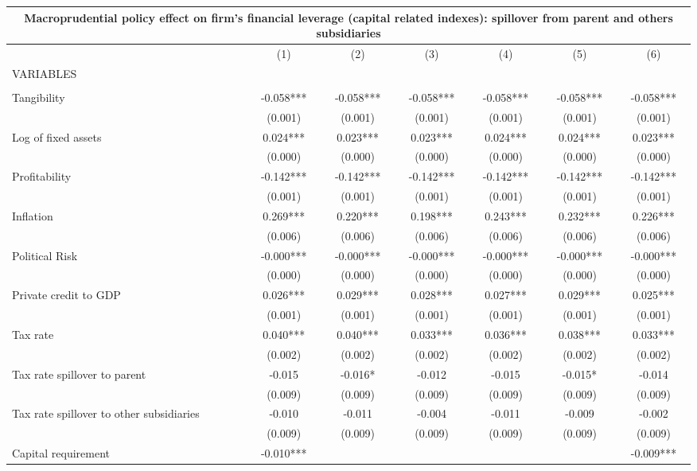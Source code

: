 \begin{tabular}{lcccccc}
\multicolumn{7}{c}{Macroprudential policy effect on firm's financial leverage (capital related indexes): spillover from parent and others subsidiaries} \\ \hline
 & (1) & (2) & (3) & (4) & (5) & (6) \\
VARIABLES &  &  &  &  &  &  \\ \hline
 &  &  &  &  &  &  \\
Tangibility & -0.058*** & -0.058*** & -0.058*** & -0.058*** & -0.058*** & -0.058*** \\
 & (0.001) & (0.001) & (0.001) & (0.001) & (0.001) & (0.001) \\
Log of fixed assets & 0.024*** & 0.023*** & 0.023*** & 0.024*** & 0.024*** & 0.023*** \\
 & (0.000) & (0.000) & (0.000) & (0.000) & (0.000) & (0.000) \\
Profitability & -0.142*** & -0.142*** & -0.142*** & -0.142*** & -0.142*** & -0.142*** \\
 & (0.001) & (0.001) & (0.001) & (0.001) & (0.001) & (0.001) \\
Inflation & 0.269*** & 0.220*** & 0.198*** & 0.243*** & 0.232*** & 0.226*** \\
 & (0.006) & (0.006) & (0.006) & (0.006) & (0.006) & (0.006) \\
Political Risk & -0.000*** & -0.000*** & -0.000*** & -0.000*** & -0.000*** & -0.000*** \\
 & (0.000) & (0.000) & (0.000) & (0.000) & (0.000) & (0.000) \\
Private credit to GDP & 0.026*** & 0.029*** & 0.028*** & 0.027*** & 0.029*** & 0.025*** \\
 & (0.001) & (0.001) & (0.001) & (0.001) & (0.001) & (0.001) \\
Tax rate & 0.040*** & 0.040*** & 0.033*** & 0.036*** & 0.038*** & 0.033*** \\
 & (0.002) & (0.002) & (0.002) & (0.002) & (0.002) & (0.002) \\
Tax rate spillover to parent & -0.015 & -0.016* & -0.012 & -0.015 & -0.015* & -0.014 \\
 & (0.009) & (0.009) & (0.009) & (0.009) & (0.009) & (0.009) \\
Tax rate spillover to other subsidiaries & -0.010 & -0.011 & -0.004 & -0.011 & -0.009 & -0.002 \\
 & (0.009) & (0.009) & (0.009) & (0.009) & (0.009) & (0.009) \\
Capital requirement & -0.010*** &  &  &  &  & -0.009*** \\

\end{tabular}
